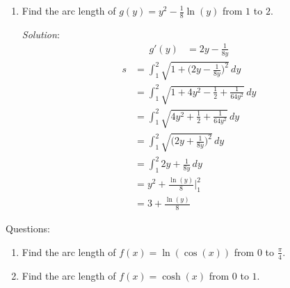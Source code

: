 \documentclass[16pt]{article}
\theoremstyle{remark}
\begin{document}
\begin{enumerate}
\item  Find the arc length of  $\displaystyle{g(y) = y^2 - \frac{1}{8}\ln(y)}$ from $\displaystyle{1}$ to $2$.
\begin{mdframed}[style=TheoremFrame]
\textit{Solution}:
\vspace*{-0.5cm}
\begin{align*}
g'(y) &= 2y-\frac{1}{8y}
\end{align*}
\vspace*{-0.5cm}
\begin{align*}
s &= \int_1^2 \sqrt{1+\bigg(2y-\frac{1}{8y}\bigg)^2}\, dy\\
&= \int_1^2 \sqrt{1+4y^2-\frac{1}{2}+\frac{1}{64y^2}}\, dy\\
&= \int_1^2 \sqrt{4y^2+\frac{1}{2}+\frac{1}{64y^2}}\, dy\\
&= \int_1^2 \sqrt{\bigg(2y+\frac{1}{8y}\bigg)^2}\, dy\\
&= \int_1^2 2y+\frac{1}{8y}\, dy\\
&= y^2 + \frac{\ln(y)}{8} \bigg|_1^2\\
&= 3+\frac{\ln(y)}{8}
\end{align*}

\end{mdframed}
\newpage
\end{enumerate}

Questions:
\begin{enumerate}
\item Find the arc length of $f(x) = \ln(\cos(x))$ from $0$ to $\displaystyle{\frac{\pi}{4}}$.
\vspace{10cm}
\item Find the arc length of $f(x) = \cosh(x)$ from $0$ to $1$.
\vspace{4cm}
\end{enumerate}
\end{document}
